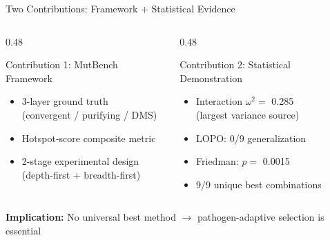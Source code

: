 \documentclass[aspectratio=169,11pt]{beamer}
\begin{document}
\begin{frame}{Two Contributions: Framework + Statistical Evidence}

\begin{columns}[T]
\begin{column}{0.48\textwidth}
\begin{block}{\textcolor{stage1blue}{Contribution 1: MutBench Framework}}
\begin{itemize}
  \item 3-layer ground truth\\(convergent / purifying / DMS)
  \item Hotspot-score composite metric
  \item 2-stage experimental design\\(depth-first + breadth-first)
\end{itemize}
\end{block}
\end{column}

\begin{column}{0.48\textwidth}
\begin{block}{\textcolor{stage2orange}{Contribution 2: Statistical Demonstration}}
\begin{itemize}
  \item Interaction $\omega^2 = $ \alert{0.285}\\(largest variance source)
  \item LOPO: \alert{0/9} generalization
  \item Friedman: $p = $ \alert{0.0015}
  \item 9/9 unique best combinations
\end{itemize}
\end{block}
\end{column}
\end{columns}

\vspace{1em}
\begin{center}
\colorbox{pahdgreen!10}{\parbox{0.85\textwidth}{\centering
\textcolor{pahdgreen}{\textbf{Implication:}} No universal best method $\to$ pathogen-adaptive selection is essential
}}
\end{center}
\end{frame}
\end{document}
